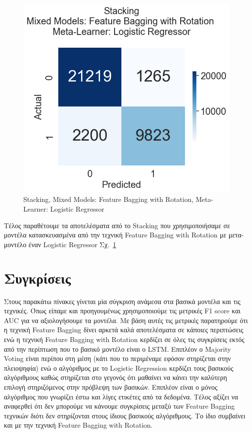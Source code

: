 \documentclass[a4paper,12pt]{report}
\theoremstyle{definitionNODot}
\begin{document}
	\begin{figure}[H]
		\centering
		\includegraphics[width=\textwidth/3]{anomaly_by_logistic_regression_mixed_models.png}
		\caption{Stacking, Mixed Models: Feature Bagging with Rotation, Meta-Learner: Logistic Regressor}
		\label{fig:anomaly_by_logistic_regression_mixed_models}
	\end{figure}
	
	Τέλος παραθέτουμε τα αποτελέσματα από το Stacking που χρησιμοποιήσαμε σε μοντέλα κατασκευασμένα από την τεχνική Feature Bagging with Rotation με μετα-μοντέλο έναν Logistic Regressor Σχ.~\ref{fig:anomaly_by_logistic_regression_mixed_models}
	
	\section{Συγκρίσεις}
	
	Στους παρακάτω πίνακες γίνεται μία σύγκριση ανάμεσα στα βασικά μοντέλα και τις τεχνικές. Όπως είπαμε και προηγουμένως χρησιμοποιούμε τις μετρικές F1 score και AUC για να αξιολογήσουμε τα μοντέλα. Με βάση αυτές τις μετρικές παρατηρούμε ότι η τεχνική Feature Bagging δίνει αρκετά καλά αποτελέσματα σε κάποιες περιπτώσεις ενώ η τεχνική Feature Bagging with Rotation κερδίζει σε όλες τις συγκρίσεις εκτός από την περίπτωση που το βασικό μοντέλο είναι ο LSTM. Επιπλέον ο Majority Voting είναι περίπου στη μέση (κάτι που το περιμέναμε εφόσον στηρίζεται στην πλειοψηφία) ενώ ο αλγόριθμος με το Logistic Regression κερδίζει τους βασικούς αλγόριθμους καθώς στηρίζεται στο γεγονός ότι μαθαίνει να κάνει την καλύτερη επιλογή στηριζόμενος στην πρόβλεψη των βασικών. Επιπλέον είναι ο μόνος αλγόριθμος που γνωρίζει έστω και λίγες ετικέτες από τα δεδομένα. Τέλος αξίζει να αναφερθεί ότι δεν μπορούμε να κάνουμε συγκρίσεις μεταξύ των Feature Bagging τεχνικών διότι δεν στηρίζονται στους ίδιους βασικούς αλγόριθμους. Το ίδιο συμβαίνει και με την τεχνική Feature Bagging with Rotation. 
	
\end{document}

